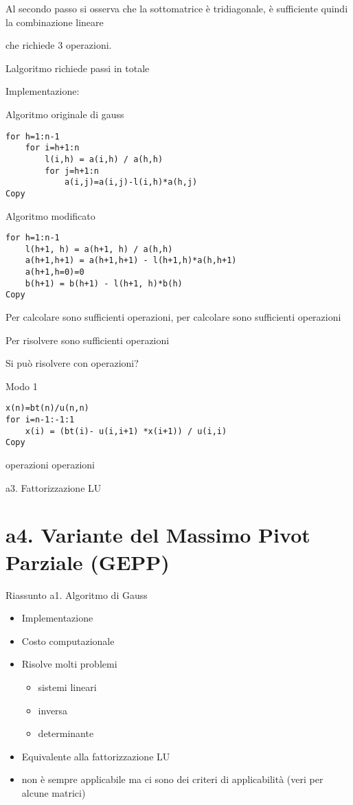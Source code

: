 \documentclass[
]{article}
\providecommand{\tightlist}{%
  \setlength{\itemsep}{0pt}\setlength{\parskip}{0pt}}
\begin{document}
Al secondo passo si osserva che la sottomatrice {} è tridiagonale, è
sufficiente quindi la combinazione lineare

{}

che richiede 3 operazioni.

L\textquotesingle algoritmo richiede {} passi in totale

Implementazione:

Algoritmo originale di gauss

\begin{verbatim}
for h=1:n-1
    for i=h+1:n
        l(i,h) = a(i,h) / a(h,h)
        for j=h+1:n
            a(i,j)=a(i,j)-l(i,h)*a(h,j)
Copy
\end{verbatim}

Algoritmo modificato

\begin{verbatim}
for h=1:n-1
    l(h+1, h) = a(h+1, h) / a(h,h)
    a(h+1,h+1) = a(h+1,h+1) - l(h+1,h)*a(h,h+1)
    a(h+1,h=0)=0
    b(h+1) = b(h+1) - l(h+1, h)*b(h)
Copy
\end{verbatim}

Per calcolare {} sono sufficienti {} operazioni, per calcolare {} sono
sufficienti {} operazioni

Per risolvere {} sono sufficienti {} operazioni

Si può risolvere con {} operazioni?

Modo 1

\begin{verbatim}
x(n)=bt(n)/u(n,n)
for i=n-1:-1:1
    x(i) = (bt(i)- u(i,i+1) *x(i+1)) / u(i,i)
Copy
\end{verbatim}

{} operazioni {} {} operazioni

a3. Fattorizzazione LU

\hypertarget{a4.-variante-del-massimo-pivot-parziale-gepp}{%
\section{a4. Variante del Massimo Pivot Parziale
(GEPP)}\label{a4.-variante-del-massimo-pivot-parziale-gepp}}

Riassunto a1. Algoritmo di Gauss

\begin{itemize}
\tightlist
\item
  Implementazione
\item
  Costo computazionale {}
\item
  Risolve molti problemi

  \begin{itemize}
  \tightlist
  \item
    sistemi lineari
  \item
    inversa
  \item
    determinante
  \end{itemize}
\item
  Equivalente alla fattorizzazione LU
\item
  non è sempre applicabile ma ci sono dei criteri di applicabilità (veri
  per alcune matrici)
\end{itemize}
\end{document}
